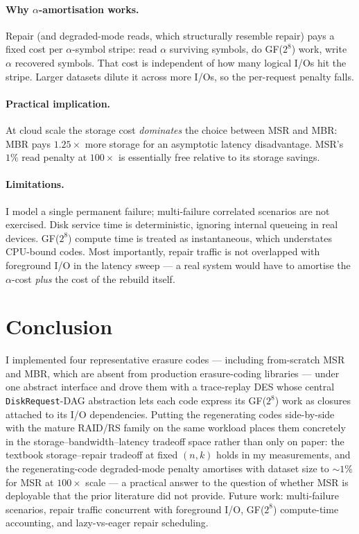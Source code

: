 \documentclass[letterpaper,twocolumn,10pt]{article}
\begin{document}
\paragraph{Why $\alpha$-amortisation works.}
Repair (and degraded-mode reads, which structurally resemble repair) pays a
fixed cost per $\alpha$-symbol stripe: read $\alpha$ surviving symbols, do
GF($2^8$) work, write $\alpha$ recovered symbols. That cost is independent
of how many logical I/Os hit the stripe. Larger datasets dilute it across
more I/Os, so the per-request penalty falls.

\paragraph{Practical implication.}
At cloud scale the storage cost \emph{dominates} the choice between MSR and
MBR: MBR pays $1.25\times$ more storage for an asymptotic latency
disadvantage. MSR's $1\%$ read penalty at $100\times$ is essentially free
relative to its storage savings.

\paragraph{Limitations.}
I model a single permanent failure; multi-failure correlated scenarios are
not exercised. Disk service time is deterministic, ignoring internal
queueing in real devices. GF($2^8$) compute time is treated as
instantaneous, which understates CPU-bound codes. Most importantly, repair
traffic is not overlapped with foreground I/O in the latency sweep --- a
real system would have to amortise the $\alpha$-cost \emph{plus} the cost of
the rebuild itself.

\section{Conclusion}
\label{sec:conc}

I implemented four representative erasure codes --- including from-scratch
MSR and MBR, which are absent from production erasure-coding libraries ---
under one abstract interface and drove them with a trace-replay DES whose
central \texttt{DiskRequest}-DAG abstraction lets each code express its
GF($2^8$) work as closures attached to its I/O dependencies. Putting the
regenerating codes side-by-side with the mature RAID/RS family on the
same workload places them concretely in the
storage--bandwidth--latency tradeoff space rather than only on paper:
the textbook storage--repair tradeoff at fixed $(n,k)$ holds in my
measurements, and the regenerating-code degraded-mode penalty amortises
with dataset size to $\sim 1\%$ for MSR at $100\times$ scale --- a
practical answer to the question of whether MSR is deployable that the
prior literature did not provide. Future work: multi-failure
scenarios, repair traffic concurrent with foreground I/O, GF($2^8$)
compute-time accounting, and lazy-vs-eager repair scheduling.



\end{document}
